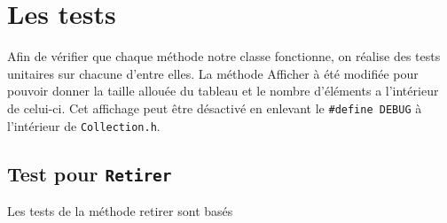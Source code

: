 \documentclass[11pt]{article}
\begin{document}
\section{Les tests}
Afin de vérifier que chaque méthode  notre classe fonctionne, on réalise des tests unitaires sur chacune d'entre elles. La méthode Afficher à été modifiée pour pouvoir donner la taille allouée du tableau et le nombre d'éléments a l'intérieur de celui-ci. Cet affichage peut être désactivé en enlevant le \texttt{\#define DEBUG} à l'intérieur de \texttt{Collection.h}.

\subsection{Test pour \tt Retirer}
Les tests de la méthode retirer sont basés 
\end{document}
